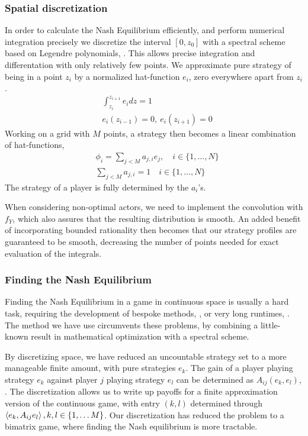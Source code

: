 \subsubsection*{Spatial discretization}
In order to calculate the Nash Equilibrium efficiently, and perform numerical integration precisely we discretize the interval $[0,z_0]$ with a spectral scheme based on Legendre polynomials, \citep{kopriva2009implementing}. This allows precise integration and differentation with only relatively few points.
We approximate pure strategy of being in a point $z_i$  by a normalized hat-function $e_i$, zero everywhere apart from $z_i$.
\begin{align*}
	& \int_{z_i}^{z_{i+1}} e_i dz = 1 \\
	&e_i(z_{i-1}) = 0,~ e_i(z_{i+1}) = 0
\end{align*}
  Working on a grid with $M$ points, a strategy then becomes a linear combination of hat-functions,
\begin{align*}
  &\phi_{i} = \sum_{j<M} a_{j,i} e_j, \quad i\in \{1,\dots, N\} \\
  &\sum_{j<M} a_{j,i} = 1 \quad i\in \{1,\dots, N\}
\end{align*}
The strategy of a player is fully determined by the $a_i$'s.

When considering non-optimal actors, we need to implement the convolution with $f_Y$, which also assures that the resulting distribution is smooth. An added benefit of incorporating bounded rationality then becomes that our strategy profiles are guaranteed to be smooth, decreasing the number of points needed for exact evaluation of the integrals.


\subsubsection*{Finding the Nash Equilibrium}
Finding the Nash Equilibrium in a game in continuous space is usually a hard task, requiring the development of bespoke methods, \citep{verticalmigration}, or very long runtimes, \citep{jerome}. The method we have use circumvents these problems, by combining a little-known result in mathematical optimization with a spectral scheme.

By discretizing space, we have reduced an uncountable strategy set to a more manageable finite amount, with pure strategies $e_k$. The gain of a player playing strategy $e_k$ against player $j$ playing strategy $e_l$ can be determined as $A_{ij}(e_k,e_l)$, . The discretization allows us to write up payoffs for a finite approximation version of the continuous game,  with entry $(k,l)$ determined through $\left \langle e_k,A_{ij}e_l \right \rangle, k,l \in \{1,\dots M\}$.
Our discretization has reduced the problem to a bimatrix game, where finding the Nash equilibrium is more tractable.

